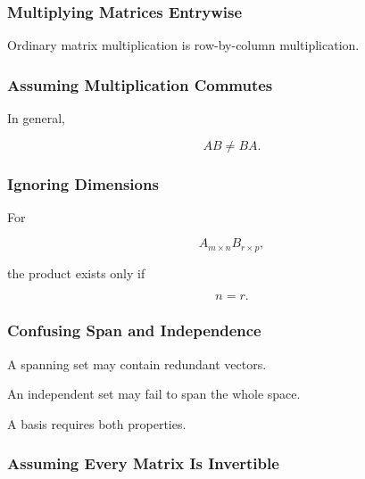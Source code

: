 \subsubsection{Multiplying Matrices Entrywise}

Ordinary matrix multiplication is row-by-column multiplication.

\subsubsection{Assuming Multiplication Commutes}
\label{subsec:error-matrix-commutative}

In general,

\[ AB\neq BA. \]

\subsubsection{Ignoring Dimensions}
\label{subsec:error-matrix-dimensions}

For

\[ A_{m\times n}B_{r\times p}, \]

the product exists only if

\[ n=r. \]

\subsubsection{Confusing Span and Independence}
\label{subsec:error-span-independence}

A spanning set may contain redundant vectors.

An independent set may fail to span the whole space.

A basis requires both properties.

\subsubsection{Assuming Every Matrix Is Invertible}
\label{subsec:error-all-matrices-invertible}

